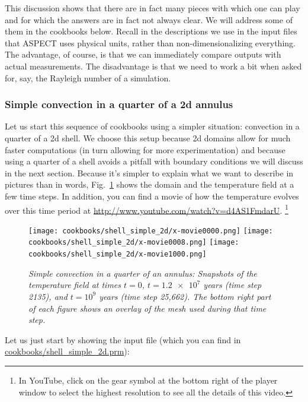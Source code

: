 \documentclass{article}
\newcommand{\aspect}{\textsc{ASPECT}}
\begin{document}
This discussion shows that there are in fact many pieces with which one can play
and for which the answers are in fact not always clear. We will address some of
them in the cookbooks below. Recall in the descriptions we use in the input
files that \aspect{} uses physical units, rather than non-dimensionalizing
everything. The advantage, of course, is that we can immediately compare outputs
with actual measurements. The disadvantage is that we need to work a bit when
asked for, say, the Rayleigh number of a simulation.


\subsubsection{Simple convection in a quarter of a 2d annulus}
\label{sec:shell-simple-2d}

Let us start this sequence of cookbooks using a simpler situation: convection in
a quarter of a 2d shell. We choose this setup because 2d domains allow for much
faster computations (in turn allowing for more experimentation) and because
using a quarter of a shell avoids a pitfall with boundary conditions we will
discuss in the next section. Because it's simpler to explain what we want to
describe in pictures than in words, Fig.~\ref{fig:simple-shell-2d} shows the
domain and the temperature field at a few time steps. In addition, you can find
a movie of how the temperature evolves over this time period at
\url{http://www.youtube.com/watch?v=d4AS1FmdarU}.%
\footnote{In YouTube, click on the gear symbol at the bottom right of the
player window to select the highest resolution to see all the details of this
video.}

\begin{figure}[tb]
\texttt{[image: cookbooks/shell\_simple\_2d/x-movie0000.png]}
\hfill
\texttt{[image: cookbooks/shell\_simple\_2d/x-movie0008.png]}
\hfill
\texttt{[image: cookbooks/shell\_simple\_2d/x-movie1000.png]}
\caption{\it Simple convection in a quarter of an annulus: Snapshots of the
temperature field at times $t=0$, $t=\num{1.2e7}$ years (time step 2135), and
$t=10^9$ years (time step 25,662). The bottom right part of each figure shows an
overlay of the mesh used during that time step.}
\label{fig:simple-shell-2d}
\end{figure}

Let us just start by showing the input file (which you can find in
\url{cookbooks/shell_simple_2d.prm}):


\end{document}
